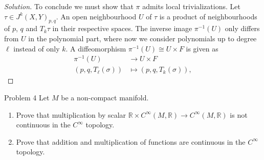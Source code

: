 \begin{proof}[Solution]
To conclude we must show that \(\pi\) admits local trivializations. Let \(\tau \in J^k(X,Y)_{p,q}\). An open neighbourhood \(U\) of \(\tau\) is a product of neighbourhoods of \(p\), \(q\) and \(T_k\tau\) in their respective spaces. The inverse image \(\pi^{-1}(U)\) only differs from \(U\) in the polynomial part, where now we consider polynomials up to degree \(\ell\) instead of only \(k\). A diffeomorphism \(\pi^{-1}(U) \cong U \times F\) is given as 
\begin{align*}
	 \pi^{-1}(U) &\longrightarrow U \times F \\
	 (p,q,T_\ell (\sigma)) &\longmapsto (p,q,T_k(\sigma)),
\end{align*}

\end{proof}

\begin{thing1}{Problem 4}\label{p:4}\leavevmode
Let \(M\) be a non-compact manifold.
\begin{enumerate}[label=(\alph*)]
\item Prove that multiplication by scalar \(\mathbb{R}\times C^\infty (M,\mathbb{R})\to C^\infty (M,\mathbb{R})\) is not continuous in the \(C^\infty \) topology.
\item Prove that addition and multiplication of functions are continuous in the \(C^\infty \) topology.
\end{enumerate}
\end{thing1}

